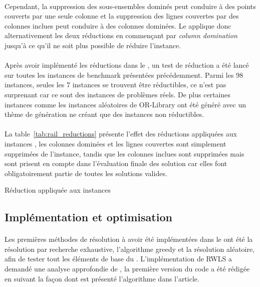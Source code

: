 \documentclass[a4paper,11pt,twoside,french,report]{../common/simplem}
\begin{document}
				\paragraph*{}
					Cependant, la suppression des sous-ensembles dominés peut conduire à des points couverts par une seule colonne et la suppression des lignes couvertes par des colonnes inclues peut conduire à des colonnes dominées. Le \solver{} applique donc alternativement les deux réductions en commençant par \textit{column domination} jusqu'à ce qu'il ne soit plus possible de réduire l'instance.
				\paragraph*{}
					Après avoir implémenté les réductions dans le \solver{}, un test de réduction a été lancé sur toutes les instances de benchmark présentées précédemment. Parmi les 98 instances, seules les 7 instances  se trouvent être réductibles, ce n'est pas surprenant car ce sont des instances de problèmes réels. De plus certaines instances comme les instances aléatoires de OR-Library ont été généré avec un thème de génération ne créant que des instances non réductibles.
				\paragraph*{}
					La table~\ref{tab:rail_reductions} présente l'effet des réductions appliquées aux instances , les colonnes dominées et les lignes couvertes sont simplement supprimées de l'instance, tandis que les colonnes inclues sont supprimées mais sont prisent en compte dans l'évaluation finale des solution car elles font obligatoirement partie de toutes les solutions valides.
				\begin{table}[H]
					\centering
					\caption{Réduction appliquée aux instances }
					\label{tab:rail_reductions}
					
				\end{table}
			\subsection{Implémentation et optimisation}
				\paragraph*{}
					Les premières méthodes de résolution à avoir été implémentées dans le \solver{} ont été la résolution par recherche exhaustive, l'algorithme greedy et la résolution aléatoire, afin de tester tout les éléments de base du \solver{}. L'implémentation de \gls{RWLS} a demandé une analyse approfondie de \cite{Gao2015}, la première version du code a été rédigée en suivant la façon dont est présenté l'algorithme dans l'article.
\end{document}
